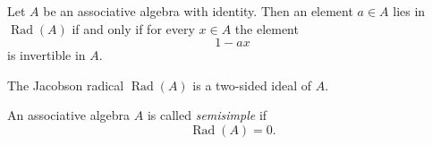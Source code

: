 \begin{proposition}
    Let $A$ be an associative algebra with identity.
    Then an element $a\in A$ lies in $\operatorname{Rad}(A)$
    if and only if for every $x\in A$ the element
    \[
        1-ax
    \]
    is invertible in $A$.
\end{proposition}


\begin{proposition}
    The Jacobson radical $\operatorname{Rad}(A)$ is a two-sided ideal of $A$.
\end{proposition}


\begin{definition}
    An associative algebra $A$ is called \emph{semisimple} if
    \[
        \operatorname{Rad}(A)=0.
    \]
\end{definition}

